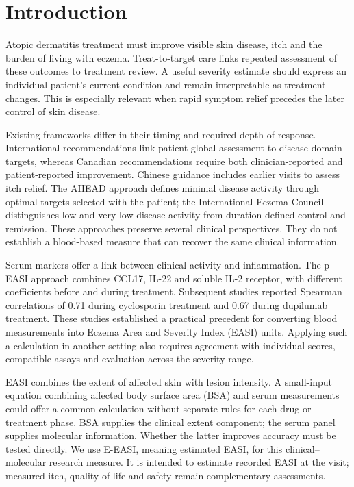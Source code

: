 \section{Introduction}
Atopic dermatitis treatment must improve visible skin disease, itch and the burden of living with eczema. Treat-to-target care links repeated assessment of these outcomes to treatment review.\citep{williams2022home,debruin2021t2t} A useful severity estimate should express an individual patient's current condition and remain interpretable as treatment changes. This is especially relevant when rapid symptom relief precedes the later control of skin disease.

Existing frameworks differ in their timing and required depth of response. International recommendations link patient global assessment to disease-domain targets, whereas Canadian recommendations require both clinician-reported and patient-reported improvement. Chinese guidance includes earlier visits to assess itch relief.\citep{debruin2021t2t,yeung2023t2t,zhao2022chinat2t,zhao2026t2t} The AHEAD approach defines minimal disease activity through optimal targets selected with the patient; the International Eczema Council distinguishes low and very low disease activity from duration-defined control and remission.\citep{silverberg2024ahead,merola2026iec} These approaches preserve several clinical perspectives. They do not establish a blood-based measure that can recover the same clinical information.

Serum markers offer a link between clinical activity and inflammation. The p-EASI approach combines CCL17, IL-22 and soluble IL-2 receptor, with different coefficients before and during treatment.\citep{thijs2017} Subsequent studies reported Spearman correlations of 0.71 during cyclosporin treatment and 0.67 during dupilumab treatment.\citep{thijs2019,bakker2020} These studies established a practical precedent for converting blood measurements into Eczema Area and Severity Index (EASI) units. Applying such a calculation in another setting also requires agreement with individual scores, compatible assays and evaluation across the severity range.\citep{luijken2020,riley2024validation}

EASI combines the extent of affected skin with lesion intensity.\citep{hanifin2022,home_easi} A small-input equation combining affected body surface area (BSA) and serum measurements could offer a common calculation without separate rules for each drug or treatment phase. BSA supplies the clinical extent component; the serum panel supplies molecular information. Whether the latter improves accuracy must be tested directly. We use E-EASI, meaning estimated EASI, for this clinical--molecular research measure. It is intended to estimate recorded EASI at the visit; measured itch, quality of life and safety remain complementary assessments.


